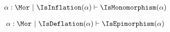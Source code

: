 \begin{sequent}
\begin{align*}
  \alpha:\Mor ~|~ \IsInflation( \alpha ) \vdash \IsMonomorphism( \alpha )
\end{align*}
\end{sequent}

\begin{sequent}
\begin{align*}
  \alpha:\Mor ~|~ \IsDeflation( \alpha ) \vdash \IsEpimorphism( \alpha )
\end{align*}
\end{sequent}
